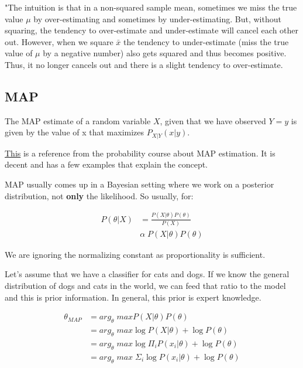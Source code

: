 "The intuition is that in a non-squared sample mean, sometimes we miss the true value $\mu$ by over-estimating and sometimes by under-estimating. But, without squaring, the tendency to over-estimate and under-estimate will cancel each other out. However, when we square $\bar{x}$ the tendency to under-estimate (miss the true value of $\mu$ by a negative number) also gets squared and thus becomes positive. Thus, it no longer cancels out and there is a slight tendency to over-estimate.
 
\subsection{MAP}

The MAP estimate of a random variable $X$, given that we have observed $Y = y$ is given by the value of x that maximizes $P_{X|Y}(x|y)$.

\href{https://www.probabilitycourse.com/chapter9/9_1_2_MAP_estimation.php}{This} is a reference from the probability course about MAP estimation. It is decent and has a few examples that explain the concept.

MAP usually comes up in a Bayesian setting where we work on a posterior distribution, not \textbf{only} the likelihood. So usually, for:

\begin{equation}
\begin{split}
    P(\theta | X) &= \frac{P(X|\theta)P(\theta)}{P(X)} \\
    &\alpha \; P(X|\theta)P(\theta)
\end{split}
\end{equation}

We are ignoring the normalizing constant as proportionality is sufficient.

Let's assume that we have a classifier for cats and dogs. If we know the general distribution of dogs and cats in the world, we can feed that ratio to the model and this is prior information. In general, this prior is expert knowledge.

\begin{equation}
\begin{split}
    \theta_{MAP} &= arg_{\theta}\; maxP(X|\theta)P(\theta) \\
    &= arg_{\theta}\; max \log P(X|\theta) + \log P(\theta) \\
    &= arg_{\theta}\; max \log \Pi_i P(x_i|\theta) + \log P(\theta)\\
    &= arg_{\theta}\; max \; \Sigma_i \log P(x_i|\theta) + \log P(\theta)
\end{split}
\end{equation}

